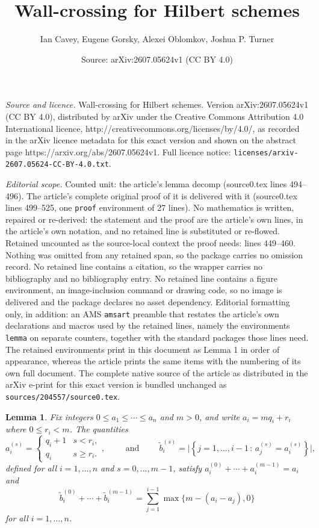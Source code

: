 \documentclass[10pt,a4paper]{amsart}
\title{Wall-crossing for Hilbert schemes}
\author{Ian Cavey, Eugene Gorsky, Alexei Oblomkov, Joshua P. Turner}
\date{Source: arXiv:2607.05624v1 (CC BY 4.0)}
\newtheorem{lemma}{Lemma}
\begin{document}
\maketitle

\noindent\emph{Source and licence.} Wall-crossing for Hilbert schemes. Version arXiv:2607.05624v1 (CC BY 4.0), distributed by arXiv under the Creative Commons Attribution 4.0 International licence, http://creativecommons.org/licenses/by/4.0/, as recorded in the arXiv licence metadata for this exact version and shown on the abstract page https://arxiv.org/abs/2607.05624v1. Full licence notice: \texttt{licenses/arxiv-2607.05624-CC-BY-4.0.txt}.\par\smallskip

\noindent\textit{Editorial scope.} Counted unit: the article's lemma decomp (source0.tex lines 494--496). The article's complete original proof of it is delivered with it (source0.tex lines 499--525, one \texttt{proof} environment of 27 lines). No mathematics is written, repaired or re-derived: the statement and the proof are the article's own lines, in the article's own notation, and no retained line is substituted or re-flowed.  Retained uncounted as the source-local context the proof needs: lines 449--460.  Nothing was omitted from any retained span, so the package carries no omission record.  No retained line contains a citation, so the wrapper carries no bibliography and no bibliography entry.  No retained line contains a figure environment, an image-inclusion command or drawing code, so no image is delivered and the package declares no asset dependency.  Editorial formatting only, in addition: an AMS \texttt{amsart} preamble that restates the article's own declarations and macros used by the retained lines, namely the environments \texttt{lemma} on separate counters, together with the standard packages those lines need.  The retained environments print in this document as Lemma 1 in order of appearance, whereas the article prints the same items with the numbering of its own full document.  The complete native source of the article as distributed in the arXiv e-print for this exact version is bundled unchanged as \texttt{sources/204557/source0.tex}.
\begin{lemma}\label{lem:div with remainder}
    Fix integers $0\leq a_1\leq \cdots \leq a_n$ and $m> 0$, and write $a_i = mq_i+r_i$ where $0\leq r_i<m$. The quantities
    \[ a_i^{(s)}=\begin{cases}
    q_i+1 & s<r_i,\\
    q_i & s\ge r_i.
    \end{cases},
    \hspace{1cm} \text{and} \hspace{1cm}
    \tilde{b}^{(s)}_i = \big|\left\{ j=1,\dots,i-1 \, : \, a^{(s)}_j = a^{(s)}_i\right\}\big|, \]
    defined for all $i=1,\dots,n$ and $s=0,\dots,m-1$, satisfy $a^{(0)}_i+\cdots+a^{(m-1)}_i = a_i$ and 
    \[ \tilde{b}^{(0)}_i+\cdots+\tilde{b}^{(m-1)}_i = \sum_{j=1}^{i-1}\max\{m-(a_i-a_j),0\} \]
    for all $i=1,\dots,n$.
\end{lemma}
\end{document}
